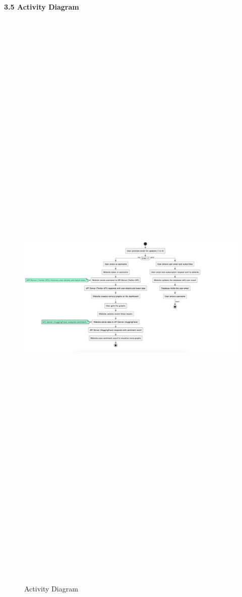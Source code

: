 \documentclass[a4paper,12pt]{article}
\begin{document}
{{{\newpage
  
		\begin{flushleft}
			\fontsize{13}{15}\selectfont\textbf{3.5 Activity Diagram}
			\label{activity}
		\end{flushleft}
								
		\begin{figure}[htbp]
			\centering
			\includegraphics[width=7in, height=15in, keepaspectratio]{ActivityDiagram.png}
			\label{activitydiagram}
			\caption{Activity Diagram}
		\end{figure}

}}}
\end{document}
